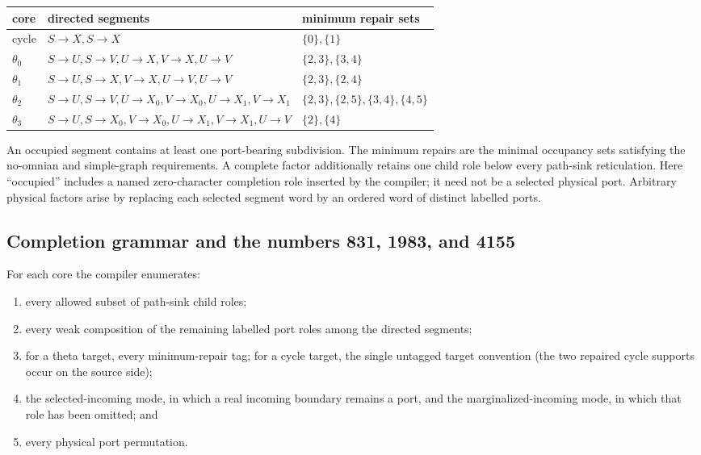 \documentclass[11pt]{article}
\theoremstyle{remark}
\begin{document}
\begin{center}
\footnotesize
\begin{tabular}{L{.10\linewidth}L{.57\linewidth}L{.22\linewidth}}
\toprule
core & directed segments & minimum repair sets\\
\midrule
cycle & \(S\!\to X,S\!\to X\) & \(\{0\},\{1\}\)\\
\(\theta_0\) & \(S\!\to U,S\!\to V,U\!\to X,V\!\to X,U\!\to V\)
 & \(\{2,3\},\{3,4\}\)\\
\(\theta_1\) & \(S\!\to U,S\!\to X,V\!\to X,U\!\to V,U\!\to V\)
 & \(\{2,3\},\{2,4\}\)\\
\(\theta_2\) & \(S\!\to U,S\!\to V,U\!\to X_0,V\!\to X_0,
U\!\to X_1,V\!\to X_1\)
 & \(\{2,3\},\{2,5\},\{3,4\},\{4,5\}\)\\
\(\theta_3\) & \(S\!\to U,S\!\to X_0,V\!\to X_0,U\!\to X_1,
V\!\to X_1,U\!\to V\)
 & \(\{2\},\{4\}\)\\
\bottomrule
\end{tabular}
\end{center}

An occupied segment contains at least one port-bearing subdivision.  The
minimum repairs are the minimal occupancy sets satisfying the no-omnian and
simple-graph requirements.  A complete factor additionally retains one child
role below every path-sink reticulation.  Here ``occupied'' includes a named
zero-character completion role inserted by the compiler; it need not be a
selected physical port.  Arbitrary physical factors arise by replacing each
selected segment word by an ordered word of distinct labelled ports.

\subsection{Completion grammar and the numbers 831, 1983, and 4155}

For each core the compiler enumerates:
\begin{enumerate}[label=(\roman*)]
  \item every allowed subset of path-sink child roles;
  \item every weak composition of the remaining labelled port roles among the
        directed segments;
  \item for a theta target, every minimum-repair tag; for a cycle target,
        the single untagged target convention (the two repaired cycle supports
        occur on the source side);
  \item the selected-incoming mode, in which a real incoming boundary remains
        a port, and the marginalized-incoming mode, in which that role has
        been omitted; and
  \item every physical port permutation.
\end{enumerate}
\end{document}
